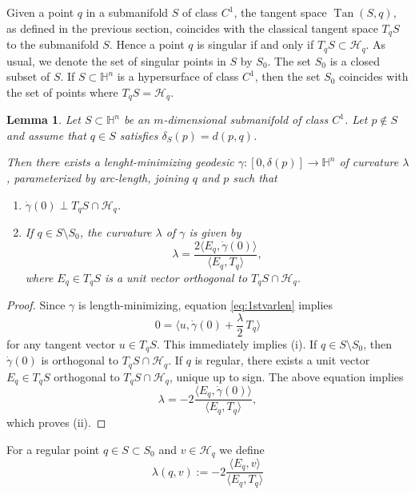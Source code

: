 \documentclass[10pt]{amsart}
\newtheorem{lemma}[theorem]{Lemma}
\theoremstyle{definition}
\theoremstyle{remark}
\numberwithin{equation}{section}
\begin{document}
Given a point $q$ in a submanifold $S$ of class $C^1$, the tangent space $\operatorname{Tan}(S,q)$, as defined in the previous section, coincides with the classical tangent space $T_qS$ to the submanifold $S$. Hence a point $q$ is singular if and only if $T_qS\subset{\mathcal{H}}_q$. As usual, we denote the set of singular points in $S$ by $S_0$. The set $S_0$ is a closed subset of $S$. If $S\subset{{\mathbb{H}}}^n$ is a hypersurface of class $C^1$, then the set $S_0$ coincides with the set of points where $T_qS={\mathcal{H}}_q$.

\begin{lemma}
Let $S\subset {{\mathbb{H}}}^n$ be an $m$-dimensional submanifold of class $C^1$. Let $p\not\in S$ and assume that $q\in S$ satisfies $\delta_S(p)=d(p,q)$. 

Then there exists a lenght-minimizing geodesic ${\gamma}:[0,\delta(p)]\to{{\mathbb{H}}}^n$ of curvature ${\lambda}$, parameterized by arc-length, joining $q$ and $p$ such that
\begin{enumerate}
\item[(i)] ${\dot{\gamma}}(0)\perp T_q S\cap{\mathcal{H}}_q$.
\item[(ii)] If $q\in S\setminus S_0$, the curvature ${\lambda}$ of ${\gamma}$ is given by
\[
{\lambda}=\frac{2{\langle{E_q,{\dot{\gamma}}(0)}\rangle}}{{\langle{E_q,T_q}\rangle}},
\]
where $E_q\in T_qS$ is a unit vector orthogonal to $T_qS\cap{\mathcal{H}}_q$.
\end{enumerate}
\end{lemma}

\begin{proof}

Since ${\gamma}$ is length-minimizing, equation \eqref{eq:1stvarlen} implies
\[
0={\langle{u,{\dot{\gamma}}(0)+\frac{\lambda}{2}\,T_q}\rangle}
\]
for any tangent vector $u\in T_qS$. This immediately implies (i). If $q\in S\setminus S_0$, then ${\dot{\gamma}}(0)$ is orthogonal to $T_qS\cap{\mathcal{H}}_q$. If $q$ is regular, there exists a unit vector $E_q\in T_qS$ orthogonal to $T_qS\cap{\mathcal{H}}_q$, unique up to sign. The above equation implies
\[
{\lambda}=-2\frac{{\langle{E_q,{\dot{\gamma}}(0)}\rangle}}{{\langle{E_q,T_q}\rangle}},
\]
which proves (ii).
\end{proof}

For a regular point $q\in S\subset S_0$ and $v\in{\mathcal{H}}_q$ we define
\begin{equation}
\label{eq:deflambda}
{\lambda}(q,v):=-2\frac{{\langle{E_q,v}\rangle}}{{\langle{E_q,T_q}\rangle}}
\end{equation}
\end{document}
